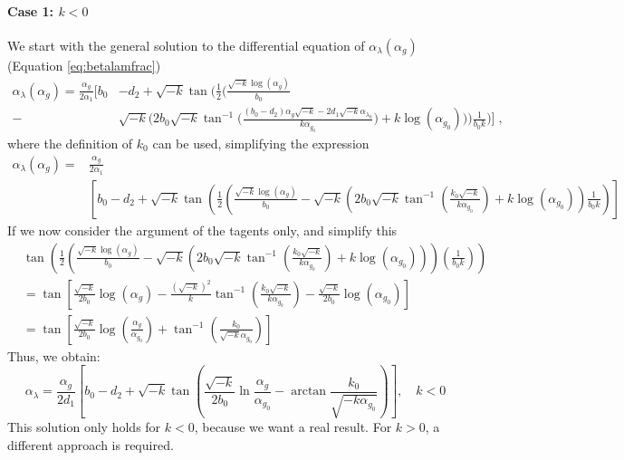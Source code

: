 \paragraph{Case 1: $k < 0$}
We start with the general solution to the differential equation of $\alpha_\lambda(\alpha_g)$ (Equation \ref{eq:betalamfrac})
\begin{align*}
    \alpha_{\lambda} (\alpha_{g}) = \frac{\alpha_{g}}{2\alpha_{1}}\Bigg[ b_0& - d_2 + 
    \sqrt{-k} \tan \bigg( \frac{1}{2} \bigg( \frac{\sqrt{-k} \log (\alpha_{g})}{b_0} 
    \\-&\sqrt{-k} \bigg( 2b_0 \sqrt{-k} \tan^{-1} \bigg( \frac{(b_0 - d_2) \alpha_{g} \sqrt{-k} - 2d_1 \sqrt{-k} \alpha_{\lambda_0}}{k \alpha_{g_0}} \bigg) + k \log (\alpha_{g_0}) 
    \bigg)\bigg) \frac{1}{b_0 k} \bigg) \Bigg]\;,
\end{align*}
where the definition of $k_0$ can be used, simplifying the expression
\begin{align*}
\alpha_{\lambda} (\alpha_{g}) =& \frac{\alpha_{g}}{2\alpha_{1}} \\&\left[ b_0 - d_2 + \sqrt{-k} \tan \left( \frac{1}{2} \left( \frac{\sqrt{-k} \log (\alpha_{g})}{b_0} - \sqrt{-k} \left( 2b_0 \sqrt{-k} \tan^{-1} \left( \frac{k_0 \sqrt{-k}}{k \alpha_{g_0}} \right) + k \log (\alpha_{g_0})\right)   \frac{1}{b_0 k} \right) \right. \right]
\end{align*}
If we now consider the argument of the tagents only, and simplify this
\begin{align*}
&\tan \left( \frac{1}{2} \left( \frac{\sqrt{-k} \log (\alpha_{g})}{b_0} - \sqrt{-k} \left( 2b_0 \sqrt{-k} \tan^{-1} \left( \frac{k_0 \sqrt{-k}}{k \alpha_{g_0}} \right) + k \log (\alpha_{g_0}) \right) \right)\left( \frac{1}{b_0 k} \right) \right)\\
&= \tan \left[ \frac{\sqrt{-k}}{2b_0} \log (\alpha_{g}) - \frac{(\sqrt{-k})^2}{k} \tan^{-1} \left( \frac{k_0 \sqrt{-k}}{k \alpha_{g_0}} \right) - \frac{\sqrt{-k}}{2b_0} \log (\alpha_{g_0}) \right] \\
&= \tan \left[ \frac{\sqrt{-k}}{2b_0} \log \left( \frac{\alpha_{g}}{\alpha_{g_0}} \right) + \tan^{-1} \left( \frac{k_0}{\sqrt{-k} \alpha_{g_0}} \right) \right]
\end{align*}
Thus, we obtain:
\begin{equation}
    \boxed{\alpha_{\lambda} = \frac{\alpha_{g}}{2d_{1}} \left[ b_0 - d_2 + \sqrt{-k} \tan\left( \frac{\sqrt{-k}}{2b_0} \ln\frac{\alpha_g}{\alpha_{g_0}} - \arctan\frac{k_0}{\sqrt{-k\alpha_{g_0}}} \right) \right] , \quad k<0 }
    \label{eq:alphalamkl0}
\end{equation}
This solution only holds for \( k < 0 \), because we want a real result. For \( k > 0 \), a different approach is required.


